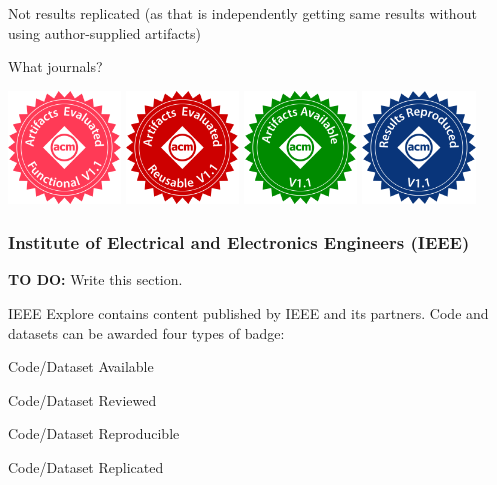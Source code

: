 Not results replicated (as that is independently getting same results without using author-supplied artifacts)

What journals?

\includegraphics[width=3cm]{images/artifacts_evaluated_functional_v1_1.png}
\includegraphics[width=3cm]{images/artifacts_evaluated_reusable_v1_1.png}
\includegraphics[width=3cm]{images/artifacts_available_v1_1.png}
\includegraphics[width=3cm]{images/results_reproduced_v1_1.png}

\subsubsection{Institute of Electrical and Electronics Engineers (IEEE)}

\textbf{TO DO:} Write this section.

IEEE Explore contains content published by IEEE and its partners. Code and datasets can be awarded four types of badge:

Code/Dataset Available

Code/Dataset Reviewed

Code/Dataset Reproducible

Code/Dataset Replicated

